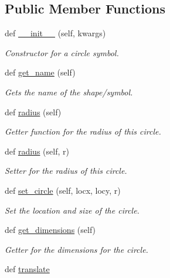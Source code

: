 \subsection*{Public Member Functions}
\begin{DoxyCompactItemize}
\item 
def \hyperlink{classbridges_1_1circle_1_1_circle_a04dfb68bb632534cf715e2ce927cc76a}{\+\_\+\+\_\+init\+\_\+\+\_\+} (self, kwargs)
\begin{DoxyCompactList}\small\item\em Constructor for a circle symbol. \end{DoxyCompactList}\item 
def \hyperlink{classbridges_1_1circle_1_1_circle_acacc4d8cc5f2db86cfcba61f31652003}{get\+\_\+name} (self)
\begin{DoxyCompactList}\small\item\em Gets the name of the shape/symbol. \end{DoxyCompactList}\item 
def \hyperlink{classbridges_1_1circle_1_1_circle_abc82c7f3e8ac6112167b396839863319}{radius} (self)
\begin{DoxyCompactList}\small\item\em Getter function for the radius of this circle. \end{DoxyCompactList}\item 
def \hyperlink{classbridges_1_1circle_1_1_circle_ae7c2dc54c90d954626f99d7561009587}{radius} (self, r)
\begin{DoxyCompactList}\small\item\em Setter for the radius of this circle. \end{DoxyCompactList}\item 
def \hyperlink{classbridges_1_1circle_1_1_circle_a42b7ccd17017ca328371ce27e1bdbffe}{set\+\_\+circle} (self, locx, locy, r)
\begin{DoxyCompactList}\small\item\em Set the location and size of the circle. \end{DoxyCompactList}\item 
def \hyperlink{classbridges_1_1circle_1_1_circle_a8b6af5d39ec48245f0244a7499082822}{get\+\_\+dimensions} (self)
\begin{DoxyCompactList}\small\item\em Getter for the dimensions for the circle. \end{DoxyCompactList}\item 
def \hyperlink{classbridges_1_1circle_1_1_circle_a45281756c505403dcee3bd5d0d04681f}{translate}

\end{DoxyCompactItemize}
